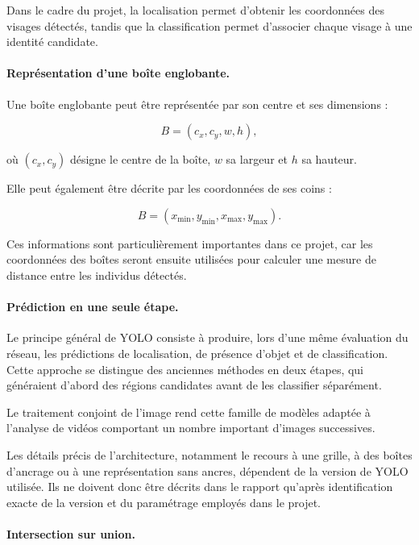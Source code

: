 \documentclass[11pt,a4paper]{report}
\begin{document}
Dans le cadre du projet, la localisation permet d'obtenir les coordonnées des
visages détectés, tandis que la classification permet d'associer chaque visage
à une identité candidate.

\paragraph{Représentation d'une boîte englobante.}

Une boîte englobante peut être représentée par son centre et ses dimensions :

\begin{equation}
    B=(c_x,c_y,w,h),
\end{equation}

où $(c_x,c_y)$ désigne le centre de la boîte, $w$ sa largeur et $h$ sa hauteur.

Elle peut également être décrite par les coordonnées de ses coins :

\begin{equation}
    B=(x_{\min},y_{\min},x_{\max},y_{\max}).
\end{equation}

Ces informations sont particulièrement importantes dans ce projet, car les
coordonnées des boîtes seront ensuite utilisées pour calculer une mesure de
distance entre les individus détectés.

\paragraph{Prédiction en une seule étape.}

Le principe général de YOLO consiste à produire, lors d'une même évaluation du
réseau, les prédictions de localisation, de présence d'objet et de
classification. Cette approche se distingue des anciennes méthodes en deux
étapes, qui généraient d'abord des régions candidates avant de les classifier
séparément.

Le traitement conjoint de l'image rend cette famille de modèles adaptée à
l'analyse de vidéos comportant un nombre important d'images successives.

Les détails précis de l'architecture, notamment le recours à une grille, à des
boîtes d'ancrage ou à une représentation sans ancres, dépendent de la version
de YOLO utilisée. Ils ne doivent donc être décrits dans le rapport qu'après
identification exacte de la version et du paramétrage employés dans le projet.

\paragraph{Intersection sur union.}
\end{document}

